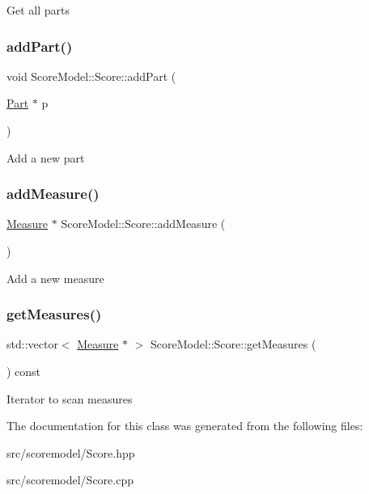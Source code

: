 Get all parts \mbox{\label{classScoreModel_1_1Score_a1e4114e834b8bea1198e36327472fd72}} 
\subsubsection{\texorpdfstring{addPart()}{addPart()}}
{\footnotesize\ttfamily void Score\+Model\+::\+Score\+::add\+Part (\begin{DoxyParamCaption}\item[{\mbox{\hyperlink{classScoreModel_1_1Part}{Part}} $\ast$}]{p }\end{DoxyParamCaption})}

Add a new part \mbox{\label{classScoreModel_1_1Score_aa528b4e1ef3181f6f90c93b49fe8fafd}} 
\subsubsection{\texorpdfstring{addMeasure()}{addMeasure()}}
{\footnotesize\ttfamily \mbox{\hyperlink{classScoreModel_1_1Measure}{Measure}} $\ast$ Score\+Model\+::\+Score\+::add\+Measure (\begin{DoxyParamCaption}{ }\end{DoxyParamCaption})}

Add a new measure \mbox{\label{classScoreModel_1_1Score_ab57bcfbe1552fba4e8e7882a7db8b21b}} 
\subsubsection{\texorpdfstring{getMeasures()}{getMeasures()}}
{\footnotesize\ttfamily std\+::vector$<$ \mbox{\hyperlink{classScoreModel_1_1Measure}{Measure}} $\ast$ $>$ Score\+Model\+::\+Score\+::get\+Measures (\begin{DoxyParamCaption}{ }\end{DoxyParamCaption}) const}

Iterator to scan measures 

The documentation for this class was generated from the following files\+:\begin{DoxyCompactItemize}
\item 
src/scoremodel/Score.\+hpp\item 
src/scoremodel/Score.\+cpp\end{DoxyCompactItemize}
